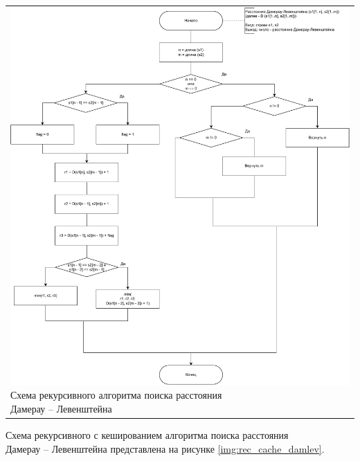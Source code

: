 \begin{table}[h!]
	\centering
	\begin{tabular}{p{1\linewidth}}
		\centering
		\includegraphics[width=1\linewidth]{include/rec_damlev.pdf}
		\captionof{figure}{Схема рекурсивного алгоритма поиска расстояния \\Дамерау -- Левенштейна}
		\label{img:recdamlev}
	\end{tabular}
\end{table}

Схема рекурсивного с кешированием алгоритма поиска расстояния \\Дамерау -- Левенштейна представлена на рисунке \ref{img:rec_cache_damlev}.

